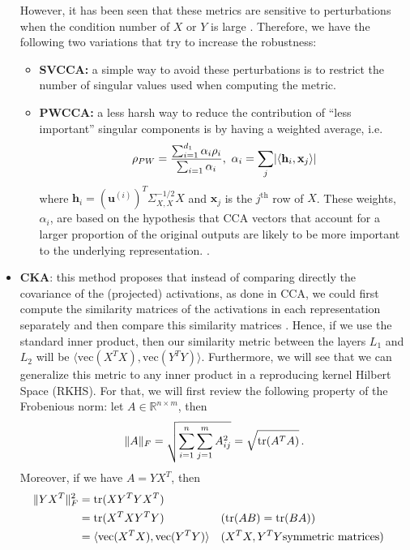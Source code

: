 \documentclass[../main.tex]{subfiles}
\begin{document}
\begin{itemize}
    However, it has been seen that these metrics are sensitive to perturbations when the condition number of $X$ or $Y$ is large \cite{kornblith_similarity_2019}. Therefore, we have the following two variations that try to increase the robustness:
    \begin{itemize}
        \item \textbf{SVCCA:} a simple way to avoid these perturbations is to restrict the number of singular values used when computing the metric.
        \item \textbf{PWCCA:} a less harsh way to reduce the contribution of ``less important'' singular components is by having a weighted average, i.e.
        \[
        \rho_{PW} = \frac{\sum_{i=1}^{d_1}\alpha_i \rho_i}{\sum_{i=1}\alpha_i},\ \alpha_i = \sum_j \lvert\langle 
\mathbf{h}_i, \mathbf{x}_j \rangle\rvert
        \]
        where $\mathbf{h}_i = (\mathbf{u}^{(i)})^T\Sigma_{X, X}^{-1/2}X $ and $\mathbf{x}_j$ is the $j^{\text{th}}$ row of $X$. These weights, $\alpha_i$, are based on the hypothesis that CCA vectors that account for a larger proportion of the original outputs are likely to be more important to the underlying representation. \cite{morcos_insights_2018}.
    \end{itemize}

    \item \textbf{CKA}: this method proposes that instead of comparing directly the covariance of the (projected) activations, as done in CCA, we could first compute the similarity matrices of the activations in each representation separately and then compare this similarity matrices \cite{kornblith_similarity_2019}. Hence, if we use the standard inner product, then our similarity metric between the layers $L_1$ and $L_2$ will be $\langle \text{vec}(X^T X), \text{vec}(Y^T Y) \rangle$. Furthermore, we will see that we can generalize this metric to any inner product in a reproducing kernel Hilbert Space (RKHS). For that, we will first review the following property of the Frobenious norm: let $A \in \mathbb{R}^{n \times m}$, then
    \[
    \lVert A\rVert_F = \sqrt{\sum_{i=1}^n\sum_{j=1}^m A_{ij}^2} = \sqrt{\text{tr}(A^TA)}\,.
    \]
    Moreover, if we have $A=Y X^T$, then
    \begin{align*}
    \lVert Y X^T\rVert_F^2 &= \text{tr}(X Y^T Y X^T) \\
    &= \text{tr}(X^T X Y^T Y) &&(\text{tr}(AB) = \text{tr}(BA))\\
    &= \langle \text{vec}(X^TX), \text{vec}(Y^TY) \rangle && (X^TX, Y^TY \text{symmetric matrices})
    \end{align*}
    

\end{itemize}
\end{document}
